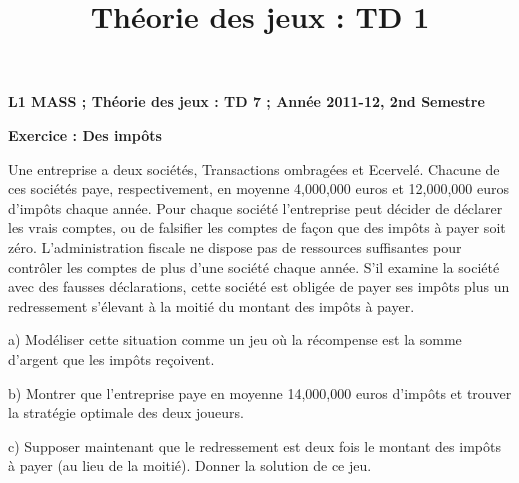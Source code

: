 \documentclass[12pt]{article}
\title{Th\'eorie des jeux : TD 1}
\date{}
\begin{document}
\pagestyle{empty}

\textbf{L1 MASS ;   Th\'eorie des jeux : TD 7    ;      Ann\'ee 2011-12, 2nd Semestre}
\medskip
\medskip
\medskip


\begin{center}
\textbf{Exercice : Des imp\^ots}
\end{center}

Une entreprise a deux soci\'et\'es, Transactions ombrag\'ees et Ecervel\'e. Chacune de ces soci\'et\'es paye, respectivement, 
en moyenne  4,000,000 euros et 12,000,000 euros d’imp\^ots chaque ann\'ee. Pour chaque soci\'et\'e l’entreprise peut d\'ecider de d\'eclarer les vrais comptes, 
ou de falsifier les comptes de façon que des imp\^ots \`a payer soit z\'ero. L’administration fiscale ne dispose pas de ressources suffisantes pour 
contr\^oler les comptes de plus d’une soci\'et\'e chaque ann\'ee. S’il examine la soci\'et\'e avec des fausses d\'eclarations, 
cette soci\'et\'e est oblig\'ee de payer ses imp\^ots plus un redressement s’\'elevant \`a la moiti\'e du montant des imp\^ots à payer.

\medskip

a) Mod\'eliser cette situation comme un jeu o\`u la r\'ecompense est la somme d’argent que les imp\^ots reçoivent.
\medskip

b) Montrer que l’entreprise paye en moyenne 14,000,000 euros d’imp\^ots et trouver la strat\'egie optimale des deux joueurs. 
\medskip

c) Supposer maintenant que le redressement est deux fois le montant des imp\^ots \`a payer (au lieu de la moiti\'e).
 Donner la solution de ce jeu.
\end{document}
